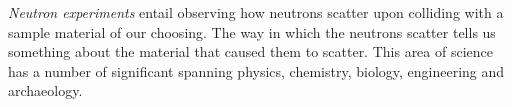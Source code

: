\textit{Neutron experiments} entail observing how neutrons scatter upon colliding with a sample material of our choosing. The way in which the neutrons scatter tells us something about the material that caused them to scatter. This area of science has a number of significant spanning physics, chemistry, biology, engineering and archaeology.

